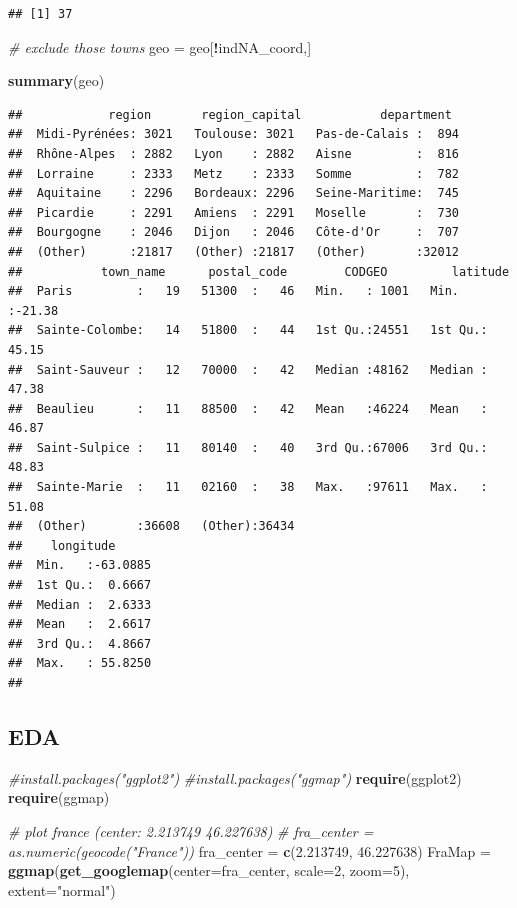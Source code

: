 \documentclass[]{article}
\newenvironment{Shaded}{\begin{snugshade}}{\end{snugshade}}
\newcommand{\KeywordTok}[1]{\textcolor[rgb]{0.13,0.29,0.53}{\textbf{#1}}}
\newcommand{\DataTypeTok}[1]{\textcolor[rgb]{0.13,0.29,0.53}{#1}}
\newcommand{\DecValTok}[1]{\textcolor[rgb]{0.00,0.00,0.81}{#1}}
\newcommand{\FloatTok}[1]{\textcolor[rgb]{0.00,0.00,0.81}{#1}}
\newcommand{\StringTok}[1]{\textcolor[rgb]{0.31,0.60,0.02}{#1}}
\newcommand{\CommentTok}[1]{\textcolor[rgb]{0.56,0.35,0.01}{\textit{#1}}}
\newcommand{\OperatorTok}[1]{\textcolor[rgb]{0.81,0.36,0.00}{\textbf{#1}}}
\newcommand{\NormalTok}[1]{#1}
\begin{document}
\begin{verbatim}
## [1] 37
\end{verbatim}

\begin{Shaded}
\begin{Highlighting}[]
\CommentTok{# exclude those towns}
\NormalTok{geo =}\StringTok{ }\NormalTok{geo[}\OperatorTok{!}\NormalTok{indNA_coord,]}

\KeywordTok{summary}\NormalTok{(geo)}
\end{Highlighting}
\end{Shaded}

\begin{verbatim}
##            region       region_capital           department   
##  Midi-Pyrénées: 3021   Toulouse: 3021   Pas-de-Calais :  894  
##  Rhône-Alpes  : 2882   Lyon    : 2882   Aisne         :  816  
##  Lorraine     : 2333   Metz    : 2333   Somme         :  782  
##  Aquitaine    : 2296   Bordeaux: 2296   Seine-Maritime:  745  
##  Picardie     : 2291   Amiens  : 2291   Moselle       :  730  
##  Bourgogne    : 2046   Dijon   : 2046   Côte-d'Or     :  707  
##  (Other)      :21817   (Other) :21817   (Other)       :32012  
##           town_name      postal_code        CODGEO         latitude     
##  Paris         :   19   51300  :   46   Min.   : 1001   Min.   :-21.38  
##  Sainte-Colombe:   14   51800  :   44   1st Qu.:24551   1st Qu.: 45.15  
##  Saint-Sauveur :   12   70000  :   42   Median :48162   Median : 47.38  
##  Beaulieu      :   11   88500  :   42   Mean   :46224   Mean   : 46.87  
##  Saint-Sulpice :   11   80140  :   40   3rd Qu.:67006   3rd Qu.: 48.83  
##  Sainte-Marie  :   11   02160  :   38   Max.   :97611   Max.   : 51.08  
##  (Other)       :36608   (Other):36434                                   
##    longitude       
##  Min.   :-63.0885  
##  1st Qu.:  0.6667  
##  Median :  2.6333  
##  Mean   :  2.6617  
##  3rd Qu.:  4.8667  
##  Max.   : 55.8250  
## 
\end{verbatim}

\subsection{EDA}\label{eda-1}

\begin{Shaded}
\begin{Highlighting}[]
\CommentTok{#install.packages("ggplot2")}
\CommentTok{#install.packages("ggmap")}
\KeywordTok{require}\NormalTok{(ggplot2)}
\KeywordTok{require}\NormalTok{(ggmap)}

\CommentTok{# plot france (center: 2.213749 46.227638)}
\CommentTok{# fra_center = as.numeric(geocode("France"))}
\NormalTok{fra_center =}\StringTok{ }\KeywordTok{c}\NormalTok{(}\FloatTok{2.213749}\NormalTok{, }\FloatTok{46.227638}\NormalTok{)}
\NormalTok{FraMap =}\StringTok{ }\KeywordTok{ggmap}\NormalTok{(}\KeywordTok{get_googlemap}\NormalTok{(}\DataTypeTok{center=}\NormalTok{fra_center, }\DataTypeTok{scale=}\DecValTok{2}\NormalTok{, }\DataTypeTok{zoom=}\DecValTok{5}\NormalTok{), }\DataTypeTok{extent=}\StringTok{"normal"}\NormalTok{)}
\end{Highlighting}
\end{Shaded}
\end{document}

